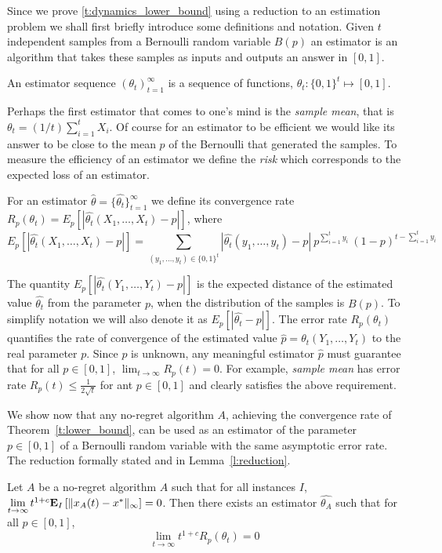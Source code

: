 Since we prove \ref{t:dynamics_lower_bound} using a reduction to
an estimation problem we shall first briefly introduce some definitions and
notation.
Given $t$ independent samples from a Bernoulli random variable $B(p)$
an estimator is an algorithm that takes these samples as inputs and
outputs an answer in $[0,1]$.
\begin{definition}\label{d:estimator}
  An estimator sequence $(\theta_t)_{t=1}^{\infty}$
  is a sequence of functions, $\theta_t: \{0,1\}^t\mapsto [0,1]$.
\end{definition}
Perhaps the first estimator that comes to one's mind is the
\emph{sample mean}, that is $\theta_t=(1/t) \sum_{i=1}^t X_i$.
Of course for an estimator to be efficient we would like its answer to be
close to the mean $p$ of the Bernoulli that generated the samples.
To measure the efficiency of an estimator we define the \emph{risk}
which corresponds to the expected loss of an estimator.
\begin{definition}\label{d:risk}
  For an estimator $\hat{\theta}
  =\{\hat{\theta_t}\}_{t=1}^\infty$ we define its convergence rate
  $R_p(\theta_t) = E_p[|\hat{\theta_t}(X_1,\ldots,X_t) - p|]$,
  where
  \[
    E_p[|\hat{\theta_t}(X_1,\ldots,X_t) - p|]
    = \sum_{(y_1,\ldots,y_t)\in\{0,1\}^t}
    |\hat{\theta_t}(y_1,\ldots,y_t) -p|\
    p^{\sum_{i=1}^t y_i}\ (1-p)^{t-\sum_{i=1}^t y_i}
  \]
\end{definition}
The quantity $E_p[|\hat{\theta_t}(Y_1,\ldots,Y_t) - p|]$ is the expected distance
of the estimated value $\hat{\theta_t}$ from the parameter $p$, when the
distribution of the samples is $B(p)$.
To simplify notation we will also denote it as $E_p[|\hat{\theta_t} - p|]$.
The error rate $R_p(\theta_t)$ quantifies the rate of
convergence of the estimated value $\hat{p} =\theta_t(Y_1,\ldots,Y_t)$ to the
real parameter $p$.  Since $p$ is unknown, any meaningful estimator $\hat{p}$
must guarantee that for all $p \in [0,1]$, $\lim_{t \to \infty}
R_p(t)=0$. For example, \emph{sample mean} has error rate $R_p(t) \leq
\frac{1}{2\sqrt{t}}$ for ant $p \in [0,1]$ and clearly satisfies the above
requirement.

We show now that any no-regret algorithm $A$, achieving the
convergence rate of Theorem~\ref{t:lower_bound}, can be used as an
estimator of the parameter $p \in [0,1]$ of a Bernoulli random variable with
the same asymptotic error rate.
The reduction formally stated and in Lemma~\ref{l:reduction}.
\begin{lemma}\label{l:reduction}
  Let $A$ be a no-regret algorithm $A$ such that for all instances $I$,
  $\lim \limits_{t \rightarrow \infty} t^{1+c}
  \bm{\mathrm{E}}_{I} \left[ \| x_A(t)-x^* \|_{\infty} \right]=0$.
  Then there exists an estimator $\hat{\theta_A}$ such that
  for all $p \in [0,1]$,
  \[\lim_{t \rightarrow \infty}t^{1+c}R_p(\theta_t)=0\]
\end{lemma}


